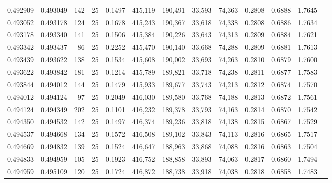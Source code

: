 \begin{tabular}{rrrrrrrrrrrrr}
0.492909 & 0.493049 &   142 &  25 &                                     0.1497 & 415,119 & 190,491 &  33,593 &  74,363 & 0.2808 & 0.6888 & 1.7645 \\
0.493052 & 0.493178 &   124 &  25 &                                     0.1678 & 415,243 & 190,367 &  33,618 &  74,338 & 0.2808 & 0.6886 & 1.7634 \\
0.493178 & 0.493340 &   141 &  25 &                                     0.1506 & 415,384 & 190,226 &  33,643 &  74,313 & 0.2809 & 0.6884 & 1.7621 \\
0.493342 & 0.493437 &    86 &  25 &                                     0.2252 & 415,470 & 190,140 &  33,668 &  74,288 & 0.2809 & 0.6881 & 1.7613 \\
0.493439 & 0.493622 &   138 &  25 &                                     0.1534 & 415,608 & 190,002 &  33,693 &  74,263 & 0.2810 & 0.6879 & 1.7600 \\
0.493622 & 0.493842 &   181 &  25 &                                     0.1214 & 415,789 & 189,821 &  33,718 &  74,238 & 0.2811 & 0.6877 & 1.7583 \\
0.493844 & 0.494012 &   144 &  25 &                                     0.1479 & 415,933 & 189,677 &  33,743 &  74,213 & 0.2812 & 0.6874 & 1.7570 \\
0.494012 & 0.494124 &    97 &  25 &                                     0.2049 & 416,030 & 189,580 &  33,768 &  74,188 & 0.2813 & 0.6872 & 1.7561 \\
0.494124 & 0.494349 &   202 &  25 &                                     0.1101 & 416,232 & 189,378 &  33,793 &  74,163 & 0.2814 & 0.6870 & 1.7542 \\
0.494350 & 0.494532 &   142 &  25 &                                     0.1497 & 416,374 & 189,236 &  33,818 &  74,138 & 0.2815 & 0.6867 & 1.7529 \\
0.494537 & 0.494668 &   134 &  25 &                                     0.1572 & 416,508 & 189,102 &  33,843 &  74,113 & 0.2816 & 0.6865 & 1.7517 \\
0.494669 & 0.494832 &   139 &  25 &                                     0.1524 & 416,647 & 188,963 &  33,868 &  74,088 & 0.2816 & 0.6863 & 1.7504 \\
0.494833 & 0.494959 &   105 &  25 &                                     0.1923 & 416,752 & 188,858 &  33,893 &  74,063 & 0.2817 & 0.6860 & 1.7494 \\
0.494959 & 0.495109 &   120 &  25 &                                     0.1724 & 416,872 & 188,738 &  33,918 &  74,038 & 0.2818 & 0.6858 & 1.7483 \\

\end{tabular}
